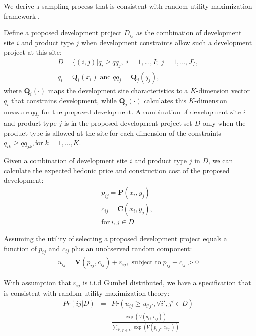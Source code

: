 We derive a sampling process that is consistent with random
utility maximization framework \cite{Wang2008}.

Define a proposed development project $D_{ij}$ as the
combination of development site $i$ and product type $j$
when development constraints allow such a development
project at this site:
\begin{eqnarray}
  D = \{(i, j) | q_i \ge qq_j, \; i=1,\ldots,I; \;j=1,\ldots,J \}, \\
  q_i = \mathbf{Q}_i(x_i) \; \mbox{and} \; qq_j = \mathbf{Q}_j(y_j),  \nonumber
\end{eqnarray}
where $\mathbf{Q}_i(\cdot)$ maps the development site
characteristics to a $K$-dimension vector $q_i$ that
constrains development, while $\mathbf{Q}_j(\cdot)$
calculates this $K$-dimension measure $qq_j$ for the
proposed development.  A combination of development site $i$
and product type $j$ is in the proposed development project
set $D$ only when the product type is allowed at the site
for each dimension of the constraints $q_{ik} \ge qq_{jk},
\mbox{for} \; k=1,\ldots, K$.

Given a combination of development site $i$ and product type
$j$ in $D$, we can calculate the expected hedonic price and
construction cost of the proposed development:
\begin{eqnarray}
    p_{ij} = \mathbf{P}(x_i, y_j) \; \label{func:p} \\
    c_{ij} = \mathbf{C}(x_i, y_j), \;  \\
    \mbox{for} \; i, j \in D  \nonumber
\end{eqnarray}

Assuming the utility of selecting a proposed development
project equals a function of $p_{ij}$ and $c_{ij}$
plus an unobserved random component:
\begin{eqnarray}
    u_{ij} = \mathbf{V}(p_{ij}, c_{ij}) + \varepsilon_{ij}, \; \mbox{subject to} \; p_{ij} - c_{ij} > 0
\end{eqnarray}

With assumption that $\varepsilon_{ij}$ is i.i.d Gumbel
distributed, we have a specification that is consistent with
random utility maximization theory:
\begin{eqnarray}
    Pr(ij|D) & = & Pr(u_{ij} \ge u_{i'j'}, \forall i',j' \in D ) \nonumber \\
             & = & \frac{\exp(V(p_{ij}, c_{ij}))}{\sum_{i',j' \in D}\exp(V(p_{i'j'}, c_{i'j'}))} \label{func:rum}
\end{eqnarray}

